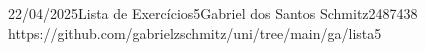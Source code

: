 \documentclass{article}
\begin{document}
{22/04/2025}{Lista de Exercícios}{5}{Gabriel dos Santos Schmitz}{2487438}
{https://github.com/gabrielzschmitz/uni/tree/main/ga/lista5}





\newpage
\printbibliography\
\end{document}
